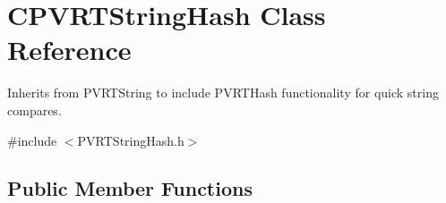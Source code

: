 \hypertarget{class_c_p_v_r_t_string_hash}{\section{C\+P\+V\+R\+T\+String\+Hash Class Reference}
\label{class_c_p_v_r_t_string_hash}
}


Inherits from P\+V\+R\+T\+String to include P\+V\+R\+T\+Hash functionality for quick string compares.  




{\ttfamily \#include $<$P\+V\+R\+T\+String\+Hash.\+h$>$}

\subsection*{Public Member Functions}
